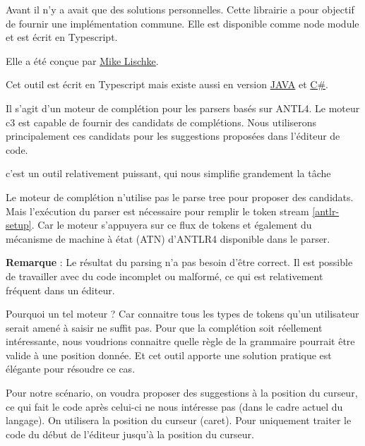 \documentclass[
    iict, %
    il, %
]{heig-tb}
\begin{document}
Avant il n'y a avait que des solutions personnelles. Cette librairie a pour objectif de fournir une implémentation commune.
Elle est disponible comme node module et est écrit en Typescript.

Elle a été conçue par \href{https://github.com/mike-lischke}{Mike Lischke}.

Cet outil est écrit en Typescript mais existe aussi en version \href{https://github.com/mike-lischke/antlr4-c3/tree/master/ports/java}{JAVA} et \href{https://github.com/mike-lischke/antlr4-c3/tree/master/ports/c%23}{C\#}.

Il s'agit d'un moteur de complétion pour les parsers basés sur ANTL4. Le moteur c3 est capable de fournir des candidats de complétions.
Nous utiliserons principalement ces candidats pour les suggestions proposées dans l'éditeur de code.

c'est un outil relativement puissant, qui nous simplifie grandement la tâche


Le moteur de complétion n'utilise pas le parse tree pour proposer des candidats. Mais l'exécution du parser est nécessaire pour remplir le token stream \ref{antlr-setup}.
Car le moteur s'appuyera sur ce flux de tokens et également du mécanisme de machine à état (ATN) d'ANTLR4 disponible dans le parser.

\textbf{Remarque} : Le résultat du parsing n'a pas besoin d'être correct. Il est possible de travailler avec du code incomplet ou malformé, ce qui est relativement fréquent dans un éditeur.

Pourquoi un tel moteur ?
Car connaitre tous les types de tokens qu'un utilisateur serait amené à saisir ne suffit pas. Pour que la complétion soit réellement intéressante, nous voudrions connaitre quelle règle de la grammaire pourrait être valide à une position donnée.
Et cet outil apporte une solution pratique est élégante pour résoudre ce cas.

Pour notre scénario, on voudra proposer des suggestions à la position du curseur, ce qui fait le code après celui-ci ne nous intéresse pas (dans le cadre actuel du langage).
On utilisera la position du curseur (caret). Pour uniquement traiter le code du début de l'éditeur jusqu'à la position du curseur.
\end{document}

